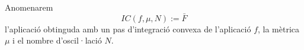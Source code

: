 \begin{nota}
    Anomenarem 
    \begin{equation*}
        IC(f,\mu,N):=\bar F
    \end{equation*}
    l'aplicació obtinguda amb un pas d'integració convexa de l'aplicació $f$, la mètrica $\mu$ i el nombre d'oscil·lació $N$.
\end{nota}


